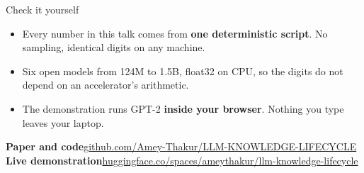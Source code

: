 \documentclass[aspectratio=169]{beamer}
\begin{document}
\begin{frame}{Check it yourself}
  \vspace{0.4cm}
  \begin{itemize}\setlength\itemsep{0.9em}
    \item Every number in this talk comes from \textbf{one deterministic script}.
          No sampling, identical digits on any machine.
    \item Six open models from 124M to 1.5B, float32 on CPU, so the digits do
          not depend on an accelerator's arithmetic.
    \item The demonstration runs GPT-2 \textbf{inside your browser}. Nothing you type
          leaves your laptop.
  \end{itemize}
  \vspace{1.2em}
  \begin{center}\footnotesize
    \textbf{Paper and code}\quad \href{https://github.com/Amey-Thakur/LLM-KNOWLEDGE-LIFECYCLE}{github.com/Amey-Thakur/LLM-KNOWLEDGE-LIFECYCLE}\\[2.5mm]
    \textbf{Live demonstration}\quad \href{https://huggingface.co/spaces/ameythakur/llm-knowledge-lifecycle}{huggingface.co/spaces/ameythakur/llm-knowledge-lifecycle}
  \end{center}
\end{frame}
\end{document}
